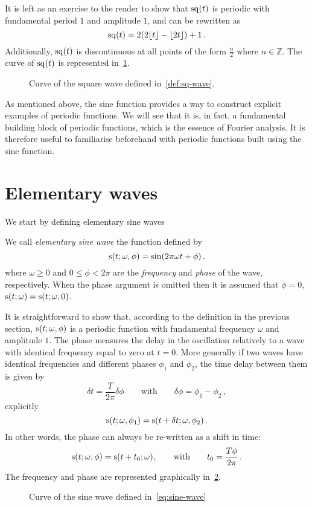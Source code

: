 \noindent It is left as an exercise to the reader to show that $\mathrm{sq}(t)$ is periodic with
fundamental period $1$ and amplitude $1$, and can be rewritten as
\begin{equation}
  \mathrm{sq}(t)=2(2\lfloor t\rfloor-\lfloor 2t\rfloor)+1\,.
\end{equation}
Additionally, $\mathrm{sq}(t)$ is discontinuous at all points of the form $\frac{n}{2}$ where
$n\in\mathbb{Z}$. The curve of $\mathrm{sq}(t)$ is represented in~\cref{fig:sq-wave}.
\begin{figure}
  \caption{Curve of the square wave defined in~\cref{def:sq-wave}.}
  \label{fig:sq-wave}
\end{figure}

As mentioned above, the sine function provides a way to construct explicit examples of
periodic functions. We will see that it is, in fact, a fundamental building block of
periodic functions, which is the essence of Fourier analysis. It is therefore useful to
familiarise beforehand with periodic functions built using the sine function.
\section{Elementary waves}
We start by defining elementary sine waves
\begin{definition}
  We call \emph{elementary sine wave} the function defined by
  \begin{equation}
    \mathrm{s}(t;\omega,\phi)=\sin(2\pi\omega t + \phi)\,.\label{eq:sine-wave}
  \end{equation}
  where $\omega\geq 0$ and $0\leq\phi<2\pi$ are the \emph{frequency} and \emph{phase} of
  the wave, respectively. When the phase argument is omitted then it is assumed that
  $\phi=0$, \ie $\mathrm{s}(t;\omega)=\mathrm{s}(t;\omega,0)$.
\end{definition}
\noindent It is straightforward to show that, according to the definition in the previous
section, $\mathrm{s}(t;\omega,\phi)$ is a periodic function with fundamental frequency $\omega$
and amplitude $1$. The phase measures the delay in the oscillation relatively to a wave
with identical frequency equal to zero at $t=0$. More generally if two waves have
identical frequencies and different phases $\phi_1$ and $\phi_2$, the time delay between
them is given by
\begin{equation}
  \delta t =\frac{T}{2\pi}\delta\phi\qquad\text{with}\qquad\delta\phi=\phi_1-\phi_2\,,
\end{equation}
explicitly
\begin{equation}
  \mathrm{s}(t;\omega,\phi_1)=\mathrm{s}(t+\delta t;\omega,\phi_2)\,.
\end{equation}
In other words, the phase can always be re-written as a shift in time:
\begin{equation}
  \mathrm{s}(t;\omega,\phi)=\mathrm{s}(t+t_0;\omega),
  \qquad\text{with}\qquad
  t_0 = \frac{T\phi}{2\pi}\,.
\end{equation}
The frequency and phase are represented graphically in~\cref{fig:sine-wave}.
\begin{figure}
  \caption{Curve of the sine wave defined in~\cref{eq:sine-wave}}
  \label{fig:sine-wave}
\end{figure}

